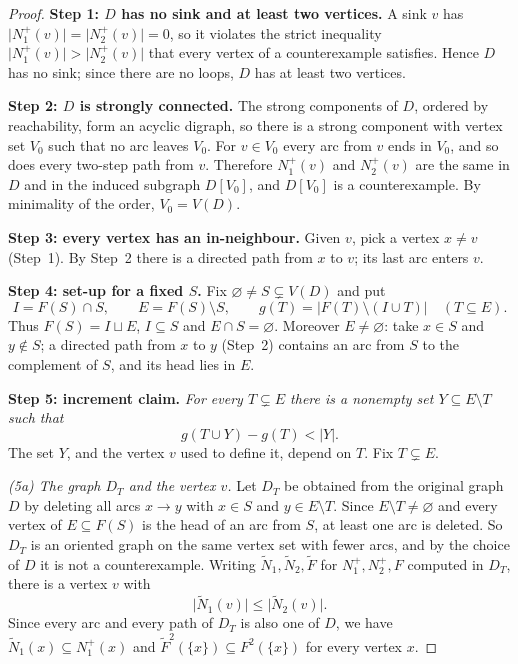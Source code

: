 \documentclass[11pt]{article}
\theoremstyle{remark}
\newcommand{\abs}[1]{\lvert #1\rvert}
\newcommand{\Step}[1]{\par\medskip\noindent\textbf{#1}\enspace}
\newcommand{\tN}{\widetilde N}
\newcommand{\tF}{\widetilde F}
\begin{document}
\begin{proof}
\Step{Step 1: $D$ has no sink and at least two vertices.}
A sink $v$ has $\abs{N_1^+(v)}=\abs{N_2^+(v)}=0$, so it violates the strict
inequality $\abs{N_1^+(v)}>\abs{N_2^+(v)}$ that every vertex of a
counterexample satisfies. Hence $D$ has no sink; since there are no loops,
$D$ has at least two vertices.

\Step{Step 2: $D$ is strongly connected.}
The strong components of $D$, ordered by reachability, form an acyclic
digraph, so there is a strong component with vertex set $V_0$ such that no
arc leaves $V_0$. For $v\in V_0$ every arc from $v$ ends in $V_0$, and so
does every two-step path from $v$. Therefore $N_1^+(v)$ and $N_2^+(v)$ are
the same in $D$ and in the induced subgraph $D[V_0]$, and $D[V_0]$ is a
counterexample. By minimality of the order, $V_0=V(D)$.

\Step{Step 3: every vertex has an in-neighbour.}
Given $v$, pick a vertex $x\ne v$ (Step~1). By Step~2 there is a directed
path from $x$ to $v$; its last arc enters $v$.

\Step{Step 4: set-up for a fixed $S$.}
Fix $\varnothing\ne S\subsetneq V(D)$ and put
\[
  I=F(S)\cap S,\qquad E=F(S)\setminus S,
  \qquad g(T)=\abs{F(T)\setminus(I\cup T)}\quad(T\subseteq E).
\]
Thus $F(S)=I\sqcup E$, $I\subseteq S$ and $E\cap S=\varnothing$. Moreover
$E\ne\varnothing$: take $x\in S$ and $y\notin S$; a directed path from $x$
to $y$ (Step~2) contains an arc from $S$ to the complement of $S$, and its
head lies in $E$.

\Step{Step 5: increment claim.}
\emph{For every $T\subsetneq E$ there is a nonempty set
$Y\subseteq E\setminus T$ such that}
\begin{equation}
\label{eq:deficit-increment}
  g(T\cup Y)-g(T)<\abs{Y}.
\end{equation}
The set $Y$, and the vertex $v$ used to define it, depend on $T$. Fix
$T\subsetneq E$.

\smallskip\noindent\emph{(5a) The graph $D_T$ and the vertex $v$.}
Let $D_T$ be obtained from the original graph $D$ by deleting all arcs
$x\to y$ with $x\in S$ and $y\in E\setminus T$. Since
$E\setminus T\ne\varnothing$ and every vertex of $E\subseteq F(S)$ is the
head of an arc from $S$, at least one arc is deleted. So $D_T$ is an
oriented graph on the same vertex set with fewer arcs, and by the choice of
$D$ it is not a counterexample. Writing $\tN_1,\tN_2,\tF$ for
$N_1^+,N_2^+,F$ computed in $D_T$, there is a vertex $v$ with
\begin{equation}\label{eq:witness}
 \abs{\tN_1(v)}\le\abs{\tN_2(v)}.
\end{equation}
Since every arc and every path of $D_T$ is also one of $D$, we have
$\tN_1(x)\subseteq N_1^+(x)$ and $\tF^2(\{x\})\subseteq F^2(\{x\})$ for
every vertex $x$.


\end{proof}
\end{document}
